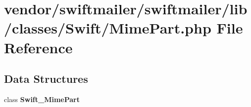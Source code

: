 \section{vendor/swiftmailer/swiftmailer/lib/classes/\+Swift/\+Mime\+Part.php File Reference}
\label{_mime_part_8php}
\subsection*{Data Structures}
\begin{DoxyCompactItemize}
\item 
class {\bf Swift\+\_\+\+Mime\+Part}
\end{DoxyCompactItemize}
